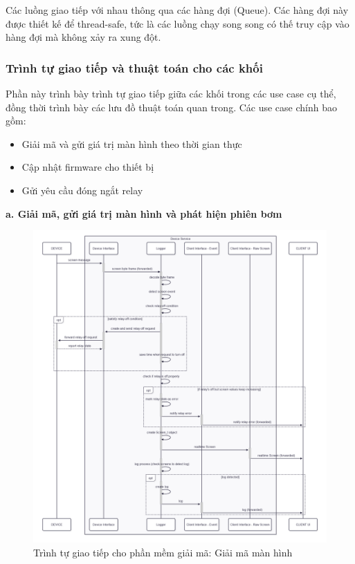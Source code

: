 Các luồng giao tiếp với nhau thông qua các hàng đợi (Queue). Các hàng đợi này được thiết kế để thread-safe, tức là các luồng chạy song song có thế truy cập vào hàng đợi mà không xảy ra xung đột.

\subsubsection{Trình tự giao tiếp và thuật toán cho các khối}

\hspace{0.8cm} Phần này trình bày trình tự giao tiếp giữa các khối trong các use case cụ thể, đồng thời trình bày các lưu đồ thuật toán quan trong. Các use case chính bao gồm:

\begin{itemize}
    \item Giải mã và gửi giá trị màn hình theo thời gian thực
    \item Cập nhật firmware cho thiết bị
    \item Gửi yêu cầu đóng ngắt relay 
\end{itemize}
\textbf{
    a. Giải mã, gửi giá trị màn hình và phát hiện phiên bơm
}

\begin{figure}[!ht]
     \centering
    \includegraphics[width=1.0\linewidth]{Figures/DeviceService_implementation-sequence-stream-screens.png}
    \caption{Trình tự giao tiếp cho phần mềm giải mã: Giải mã màn hình}
    \label{fig:DeviceService_implementation-sequence-stream-screens}
\end{figure}

